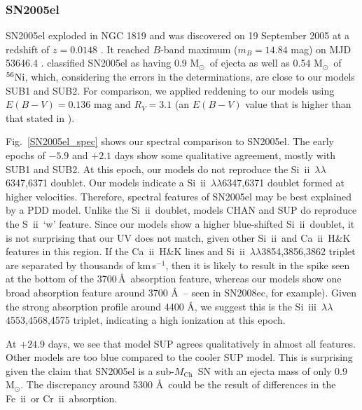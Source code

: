 \documentclass[useAMS,usenatbib,useasmath]{mnras}
\newcommand{\Mch}{\hbox{$M_{\text{Ch}}$}}
\newcommand{\Msun}{\hbox{M$_\odot$}}
\newcommand{\kms}{\hbox{km$\,$s$^{-1}$}}
\newcommand{\elem}[2][default]{$^{#1}{\rm #2}$}
\newcommand{\caii}{\mbox{Ca~{\sc ii}}}
\newcommand{\skii}{\mbox{Si~{\sc ii}}}
\newcommand{\skiii}{\mbox{Si~{\sc iii}}}
\newcommand{\feii}{\mbox{Fe~{\sc ii}}}
\newcommand{\crii}{\mbox{Cr~{\sc ii}}}
\newcommand{\sii}{\mbox{S~{\sc ii}}}
\newcommand{\lb}{$\lambda$}
\def\fig{Fig.}
\begin{document}
\subsubsection{SN2005el}%
\label{SN2005el}
SN2005el exploded in NGC 1819 and was discovered on 19 September 2005 \citep{Madison2005} at a redshift of $z=0.0148$ \citep{Hicken2009}. It reached $B$-band maximum ($m_B=14.84$ mag) on MJD 53646.4 \citep{Hicken2009}. \cite{Scalzo2014a} classified SN2005el as having 0.9 \Msun\ of ejecta as well as 0.54 \Msun\ of \elem[56]{Ni}, which, considering the errors in the determinations, are close to our models SUB1 and SUB2. For comparison, we applied reddening to our models using $E(B-V)=0.136$ mag and $R_V=3.1$ (an $E(B-V)$ value that is higher than that stated in \cite{Scalzo2014a}).

\fig~\ref{SN2005el_spec} shows our spectral comparison to SN2005el. The early epochs of $-5.9$ and $+2.1$ days show some qualitative agreement, mostly with SUB1 and SUB2. At this epoch, our models do not reproduce the \skii\ \lb\lb6347,6371 doublet. Our models indicate a \skii\ \lb\lb6347,6371 doublet formed at higher velocities. Therefore, spectral features of SN2005el may be best explained by a PDD model. Unlike the \skii\ doublet, models CHAN and SUP do reproduce the \sii\ `w' feature. Since our models show a higher blue-shifted \skii\ doublet, it is not surprising that our UV does not match, given other \skii\ and \caii\ H\&K features in this region. 
If the \caii\ H\&K lines and \skii\ \lb\lb3854,3856,3862 triplet are separated by thousands of \kms, then it is likely to result in the spike seen at the bottom of the 3700\,\AA\ absorption feature, whereas our models show one broad absorption feature around 3700 \AA\ -- seen in SN2008ec, for example).
 Given the strong absorption profile around 4400 \AA, we suggest this is the \skiii\ \lb\lb4553,4568,4575 triplet, indicating a high ionization at this epoch.

At $+24.9$ days, we see that model SUP agrees qualitatively in almost all features. Other models are too blue compared to the cooler SUP model. This is surprising given the claim that SN2005el is a sub-\Mch\ SN with an ejecta mass of only 0.9 \Msun. The discrepancy around 5300 \AA\ could be the result of differences in the \feii\ or \crii\ absorption.
\end{document}

